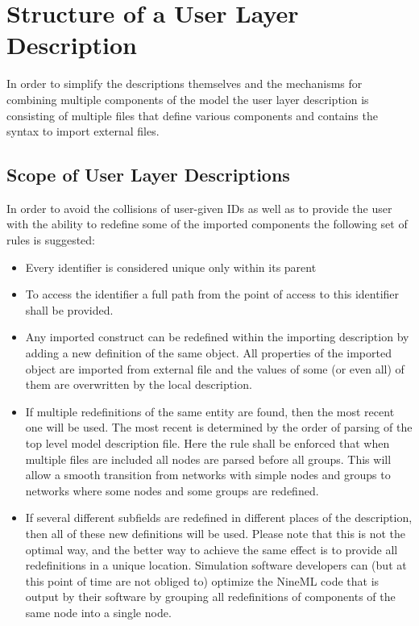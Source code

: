 \documentclass{article}
\begin{document}
\section{Structure of a User Layer Description}

In order to simplify the descriptions themselves and the mechanisms for
combining multiple components of the model the user layer description
is consisting of multiple files that define various components and
contains the syntax to import external files.

\subsection{Scope of User Layer Descriptions}
\label{scope}

In order to avoid the collisions of user-given IDs as well as to
provide the user with the ability to redefine some of the imported
components the following set of rules is suggested:
\begin{itemize}
\item{Every identifier is considered unique only within its parent}
\item{To access the identifier a full path from the point of access
to this identifier shall be provided.}
\item{Any imported construct can be redefined within the importing
description by adding a new definition of the same object. All properties
of the imported object are imported from external file and the values of
some (or even all) of them are overwritten by the local description.}
\item{If multiple redefinitions of the same entity are found, then the most
recent one will be used. The most recent is determined by the order of
parsing of the top level model description file. Here the rule shall be
enforced that when multiple files are included all nodes are parsed before
all groups. This will allow a smooth transition from networks with simple
nodes and groups to networks where some nodes and some groups are redefined.}
\item{If several different subfields are redefined in different places of the
description, then all of these new definitions will be used. Please note that
this is not the optimal way, and the better way to achieve the same effect is
to provide all redefinitions in a unique location. Simulation software
developers can (but at this point of time are not obliged to) optimize the
NineML code that is output by their software by grouping all redefinitions
of components of the same node into a single node.}
\end{itemize}
\end{document}
